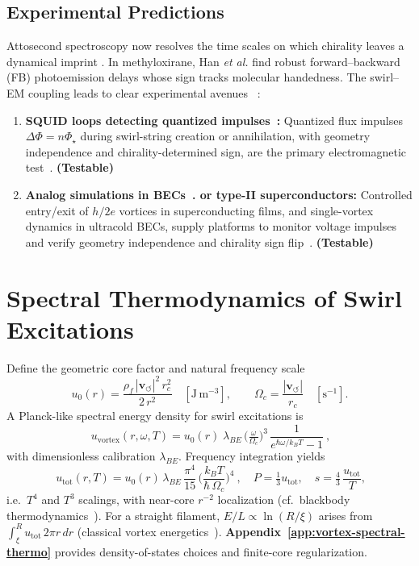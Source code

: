 \documentclass[10pt,reprint,aps,onecolumn,nofootinbib]{revtex4-2}
\newcommand{\testable}{\textbf{(Testable)}}
\begin{document}
        \subsection*{Experimental Predictions}
            Attosecond spectroscopy now resolves the time scales on which chirality leaves a dynamical imprint \cite{Krausz2009,Beaulieu2018}. In methyloxirane, Han \emph{et al.} \cite{Han2025} find robust forward–backward (FB) photoemission delays whose sign tracks molecular handedness.
            The swirl–EM coupling leads to clear experimental avenues~ \cite{EM_G}:
            \begin{enumerate}
            \item \textbf{SQUID loops detecting quantized impulses~\cite{sstAttosecondPhotoionization,DeaverFairbank1961,DollNäbauer1961,ClarkeBraginski2011}:} Quantized flux impulses $\Delta\Phi=n\Phi_\star$ during swirl-string creation or annihilation, with geometry independence and chirality-determined sign, are the primary electromagnetic test~\cite{EM_G}. \testable
            \item \textbf{Analog simulations in BECs~\cite{BarceloLiberatiVisser2011,SchererWeilerNeelyAnderson2007}. or type-II superconductors:} Controlled entry/exit of $h/2e$ vortices in superconducting films, and single-vortex dynamics in ultracold BECs, supply platforms to monitor voltage impulses and verify geometry independence and chirality sign flip~\cite{EM_G}. \testable
            \end{enumerate}

    \section{Spectral Thermodynamics of Swirl Excitations}\label{sec:spectral-thermo}
        Define the geometric core factor and natural frequency scale
        \[
            u_0(r)=\frac{\rho_{\!f}\,|\mathbf{v}_{\!\boldsymbol{\circlearrowleft}}|^{2}\,r_c^{2}}{2\,r^{2}}
            \quad [\mathrm{J\,m^{-3}}],\qquad
            \Omega_c=\frac{|\mathbf{v}_{\!\boldsymbol{\circlearrowleft}}|}{r_c}\quad [\mathrm{s^{-1}}].
        \]
        A Planck-like spectral energy density for swirl excitations is
        \[
            \boxed{~
            u_{\mathrm{vortex}}(r,\omega,T)=u_0(r)\;\lambda_{\!BE}\,
            \Big(\tfrac{\omega}{\Omega_c}\Big)^{3}\,
            \frac{1}{e^{\hbar\omega/k_B T}-1}
            ~},
        \]
        with dimensionless calibration \(\lambda_{\!BE}\). Frequency integration yields
        \[
            \boxed{~
            u_{\mathrm{tot}}(r,T)=u_0(r)\,\lambda_{\!BE}\,\frac{\pi^{4}}{15}\,
            \Big(\frac{k_B T}{\hbar\,\Omega_c}\Big)^{\!4}
                ~},\quad
            P=\tfrac{1}{3}u_{\mathrm{tot}},\quad
            s=\tfrac{4}{3}\,\frac{u_{\mathrm{tot}}}{T},
        \]
        i.e.\ \(T^4\) and \(T^3\) scalings, with near-core \(r^{-2}\) localization (cf.\ blackbody thermodynamics~\cite{Planck1901,LandauFM}).
        For a straight filament, \(E/L \propto \ln(R/\xi)\) arises from \(\int_\xi^R u_{\mathrm{tot}}\,2\pi r\,dr\) (classical vortex energetics~\cite{Saffman1992}).
        \textbf{Appendix~\ref{app:vortex-spectral-thermo}} provides density-of-states choices and finite-core regularization.
\end{document}
